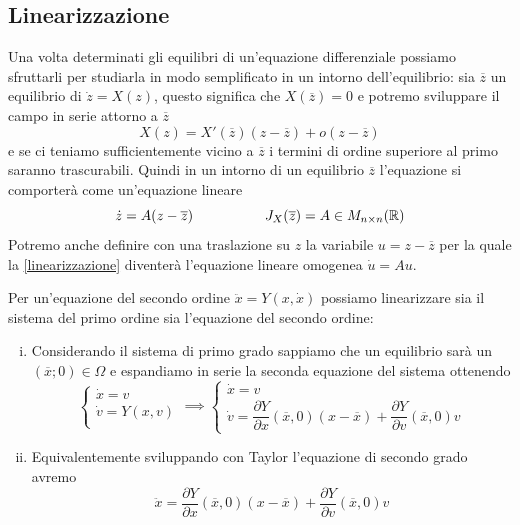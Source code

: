 \documentclass[11pt,a4paper,twoside]{book}
\theoremstyle{esss}
\theoremstyle{dotless}
\numberwithin{equation}{section} %
\begin{document}
\subsection{Linearizzazione}\label{sezLinearizzazione}
Una volta determinati gli equilibri di un'equazione differenziale possiamo sfruttarli per studiarla in modo semplificato in un intorno dell'equilibrio:
sia $\overline{z}$ un equilibrio di $\dot{z}=X(z)$, questo significa che $X(\overline{z})=0$ e potremo sviluppare il campo in serie attorno a $\overline{z}$
\[
X(z)=X'(\overline{z})(z-\overline{z}) + o(z-\overline{z})
\] 
e se ci teniamo sufficientemente vicino a $\overline{z}$ i termini di ordine superiore al primo saranno trascurabili. 
Quindi in un intorno di un equilibrio $\overline{z}$ l'equazione si comporterà come un'equazione lineare
\begin{equation}\label{linearizzazione}
\dot{z}=A(z-\overline{z}) \hspace{0.15\linewidth} J_X(\overline{z})=A\in M_{n\times n}(\mathbb{R})
\end{equation}
Potremo anche definire con una traslazione su $z$ la variabile $u=z-\overline{z}$ per la quale la \eqref{linearizzazione} diventerà l'equazione lineare omogenea $\dot{u}=Au$.


Per un'equazione del secondo ordine $\ddot{x}=Y(x,\dot{x})$ possiamo linearizzare sia il sistema del primo ordine sia l'equazione del secondo ordine:
\begin{enumerate}[i.]
\item Considerando il sistema di primo grado sappiamo che un equilibrio sarà un $(\overline{x};0)\in\Omega$ e espandiamo in serie la seconda equazione del sistema ottenendo
\[
\begin{cases}
\dot{x}=v \\
\dot{v}=Y(x,v) \\
\end{cases} \implies
\begin{cases}
\dot{x}=v \\
\dot{v}=\dfrac{\partial Y}{\partial x}(\overline{x},0) (x-\overline{x}) + \dfrac{\partial Y}{\partial v}(\overline{x},0) v 
\end{cases}
\]
\item Equivalentemente sviluppando con Taylor l'equazione di secondo grado avremo
\[
\ddot{x}=\dfrac{\partial Y}{\partial x}(\overline{x},0) (x-\overline{x}) + \dfrac{\partial Y}{\partial v}(\overline{x},0) v 
\]
\end{enumerate}
\end{document}
